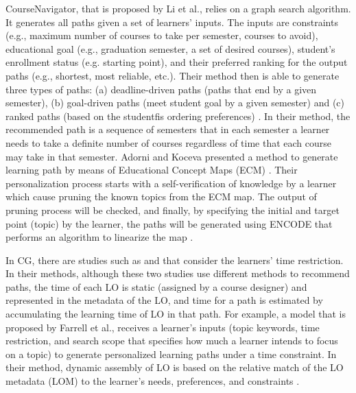 \documentclass{sig-alternate}
\begin{document}
CourseNavigator, that is proposed by Li et al., relies on a graph search algorithm. It generates all paths given a set of learners’ inputs. The inputs are constraints (e.g., maximum number of courses to take per semester, courses to avoid), educational goal (e.g., graduation semester, a set of desired courses), student’s enrollment status (e.g. starting point), and their preferred ranking for the output paths (e.g., shortest, most reliable, etc.). Their method then is able to generate three types of paths: (a) deadline-driven paths (paths that end by a given semester), (b) goal-driven paths (meet student goal by a given semester) and (c) ranked paths (based on the studentfis ordering preferences) \cite{nabizadeh2015long}. In their method, the recommended path is a sequence of semesters that in each semester a learner needs to take a definite number of courses regardless of time that each course may take in that semester. Adorni and Koceva presented a method to generate learning path by means of Educational Concept Maps (ECM) \cite{adorni2015designing}. Their personalization process starts with a self-verification of knowledge by a learner which cause pruning the known topics from the ECM map. The output of pruning process will be checked, and finally, by specifying the initial and target point (topic) by the learner, the paths will be generated using ENCODE that performs an algorithm to linearize the map \cite{adorni2016educational}.

In CG, there are studies such as \cite{durand2011learning} and \cite{farrell2004dynamic} that consider the learners’ time restriction. In their methods, although these two studies use different methods to recommend paths, the time of each LO is static (assigned by a course designer) and represented in the metadata of the LO, and time for a path is estimated by accumulating the learning time of LO in that path. For example, a model that is proposed by Farrell et al., receives a learner’s inputs (topic keywords, time restriction, and search scope that specifies how much a learner intends to focus on a topic) to generate personalized learning paths under a time constraint. In their method, dynamic assembly of LO is based on the relative match of the LO metadata (LOM) to the learner’s needs, preferences, and constraints \cite{farrell2004dynamic}.
\end{document}
